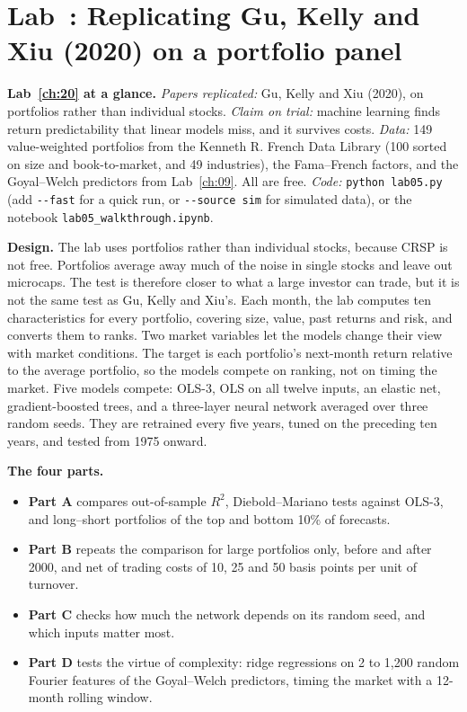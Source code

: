 \section{Lab~\thechapter: Replicating Gu, Kelly and Xiu (2020) on a portfolio panel}
\label{sec:20-lab}

\begin{callout}
\textbf{Lab~\ref{ch:20} at a glance.} \emph{Papers replicated:} Gu, Kelly and Xiu (2020), on portfolios rather than individual stocks. \emph{Claim on trial:} machine learning finds return predictability that linear models miss, and it survives costs. \emph{Data:} 149 value-weighted portfolios from the Kenneth R. French Data Library (100 sorted on size and book-to-market, and 49 industries), the Fama--French factors, and the Goyal--Welch predictors from Lab~\ref{ch:09}. All are free. \emph{Code:} \texttt{python lab05.py} (add \texttt{-{}-fast} for a quick run, or \texttt{-{}-source sim} for simulated data), or the notebook \texttt{lab05\_walkthrough.ipynb}.
\end{callout}

\textbf{Design.} The lab uses portfolios rather than individual stocks, because CRSP is not free. Portfolios average away much of the noise in single stocks and leave out microcaps. The test is therefore closer to what a large investor can trade, but it is not the same test as Gu, Kelly and Xiu's. Each month, the lab computes ten characteristics for every portfolio, covering size, value, past returns and risk, and converts them to ranks. Two market variables let the models change their view with market conditions. The target is each portfolio's next-month return relative to the average portfolio, so the models compete on ranking, not on timing the market. Five models compete: OLS-3, OLS on all twelve inputs, an elastic net, gradient-boosted trees, and a three-layer neural network averaged over three random seeds. They are retrained every five years, tuned on the preceding ten years, and tested from 1975 onward.

\textbf{The four parts.}
\begin{itemize}
  \item \textbf{Part A} compares out-of-sample $R^2$, Diebold--Mariano tests against OLS-3, and long--short portfolios of the top and bottom 10\% of forecasts.
  \item \textbf{Part B} repeats the comparison for large portfolios only, before and after 2000, and net of trading costs of 10, 25 and 50 basis points per unit of turnover.
  \item \textbf{Part C} checks how much the network depends on its random seed, and which inputs matter most.
  \item \textbf{Part D} tests the virtue of complexity: ridge regressions on 2 to 1,200 random Fourier features of the Goyal--Welch predictors, timing the market with a 12-month rolling window.
\end{itemize}

